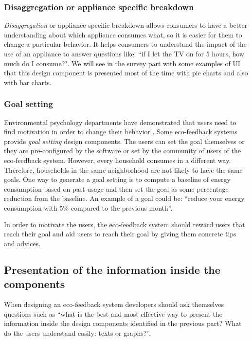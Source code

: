 \documentclass[journal]{vgtc}                %
\begin{document}
\subsubsection{Disaggregation or appliance specific breakdown}
\textit{Disaggregation} or appliance-specific breakdown allows consumers to have a better understanding about which appliance consumes what, so it is easier for them to change a particular behavior. It helps consumers to understand the impact of the use of an appliance to answer questions like: ``if I let the TV on for 5 hours, how much do I consume?".
We will see in the survey part with some examples of UI that this design component is presented most of the time with pie charts and also with bar charts.

\subsubsection{Goal setting}
Environmental psychology departments have demonstrated that users need to find motivation in order to change their behavior \cite{abrahamse2007effect}.
Some eco-feedback systems provide \textit{goal setting} design components. The users can set the goal themselves or they are pre-configured by the software or set by the community of users of the eco-feedback system. However, every household consumes in a different way. Therefore, households in the same neighborhood are not likely to have the same goals. 
One way to generate a goal setting is to compute a baseline of energy consumption based on past usage and then set the goal as some percentage reduction from the baseline. %
An example of a goal could be: ``reduce your energy consumption with 5\% compared to the previous month''.

In order to motivate the users, the eco-feedback system should reward users that reach their goal and aid users to reach their goal by giving them concrete tips and advices.

\subsection{Presentation of the information inside the components} %

When designing an eco-feedback system developers should ask themselves questions such as ``what is the best and most effective way to present the information inside the design components identified in the previous part? What do the users understand easily: texts or graphs?''.
\end{document}
